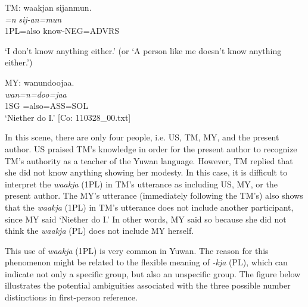   TM: \glll  waakjan  sijanmun.\\
    \textit{=n}  \textit{sij-an=mun}\\
    1PL=also  know-NEG=ADVRS\\
    \glt {} \parbox{\linewidth-\widthof{TM:}}{‘I don’t know anything either.’ (or ‘A person like me doesn’t know anything either.’)}

MY: \glll  wanundoojaa.\\
\textit{wan=n=doo=jaa}\\
1SG =also=ASS=SOL\\
\glt {} ‘Niether do I.’ [Co: 110328\_00.txt]
\z

In this scene, there are only four people, i.e. US, TM, MY, and the present author. US praised TM’s knowledge in order for the present author to recognize TM’s authority as a teacher of the Yuwan language. However, TM replied that she did not know anything showing her modesty. In this case, it is difficult to interpret the \textit{waakja} (1PL) in TM’s utterance as including US, MY, or the present author. The MY’s utterance (immediately following the TM’s) also shows that the \textit{waakja} (1PL) in TM’s utterance does not include another participant, since MY said ‘Niether do I.’ In other words, MY said so because she did not think the \textit{waakja} (PL) does not include MY herself.

This use of \textit{waakja} (1PL) is very common in Yuwan. The reason for this phenomenon might be related to the flexible meaning of \textit{{}-kja} (PL), which can indicate not only a specific group, but also an unspecific group. The figure below illustrates the potential ambiguities associated with the three possible number distinctions in first-person reference.



